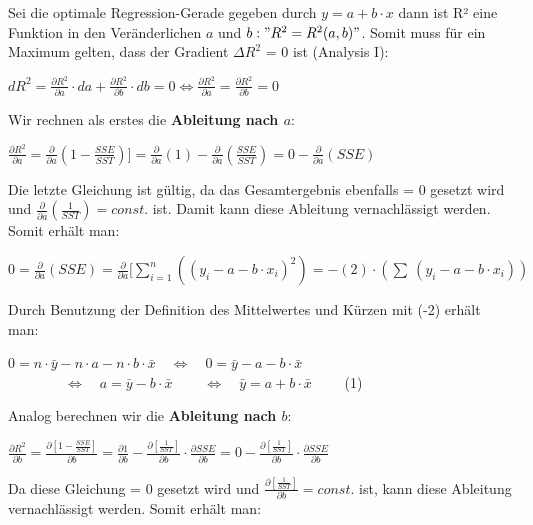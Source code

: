 \documentclass[12pt]{article}
\begin{document}
Sei die optimale Regression-Gerade gegeben durch $ y = a + b \cdot x $ dann ist R² eine Funktion in den Veränderlichen $a$ und $ b: " R^2 = R^2(a,b)" $. Somit muss für ein Maximum gelten, dass der Gradient $\Delta{R^2}$ = 0 ist (Analysis I): 
\begin{center}
\begin{large} 
$  dR^2 = \frac{\partial R^2}{\partial a} \cdot da + \frac{\partial R^2}{\partial b} \cdot db = 0 \Longleftrightarrow  \frac{\partial R^2}{\partial a} = \frac{\partial R^2}{\partial b} = 0 $
\end{large}
\end{center}
%
Wir rechnen als erstes die \textbf{Ableitung nach $a$}:
% 
\begin{center}
\begin{large} 
$ \frac{\partial R^2}{\partial a} = \frac{\partial}{\partial a}(1 - \frac {SSE}{SST})]  =  \frac{\partial}{\partial a}(1) - \frac{\partial}{\partial a}(\frac{SSE}{SST})= 0 -  \frac{\partial}{\partial a}(SSE) $ 
\end{large}
\end{center}
% 
Die letzte Gleichung ist gültig, da das Gesamtergebnis ebenfalls = 0 gesetzt wird und $ \frac{\partial}{\partial a}(\frac{1}{SST}) = const. $ ist. Damit kann diese Ableitung vernachlässigt werden. Somit erhält man: \\ 

\begin{center}
\begin{large} 
$ 0 = \frac{\partial}{\partial a}(SSE) = \frac{\partial}{\partial a}[\sum\limits_{i=1}^n {((y_i - a -b \cdot x_i)^2)} = -(2) \cdot (\sum\ (y_i - a - b \cdot  x_i)) $
\end{large}
\end{center}
%
Durch Benutzung der Definition des Mittelwertes und Kürzen mit (-2) erhält man: 

\begin{center}
$ 0 = n \cdot \bar{y} - n \cdot a -n \cdot b \cdot \bar{x} \quad \Leftrightarrow \quad 0 = \bar{y} - a  -b \cdot \bar{x}$ \\[0.2cm] 
$ \qquad \qquad \Leftrightarrow \quad a = \bar{y} -b \cdot \bar{x} \qquad\ \Leftrightarrow \quad \bar{y} = a +  b \cdot \bar{x} \qquad $ (1)
\end{center}

Analog berechnen wir die \textbf{Ableitung nach $b$}:
 
\begin{center}
\begin{large} 
$ \frac{\partial R^2}{\partial b} = \frac{\partial [ 1 - \frac {SSE}{SST}]}{\partial b} =  \frac{\partial 1}{\partial b} - \frac{\partial [\frac{1}{SST}]}{\partial b} \cdot \frac{\partial SSE}{\partial b} = 0 -  \frac{\partial [\frac{1}{SST}]}{\partial b} \cdot \frac{\partial SSE}{\partial b} $ 
\end{large}
\end{center}
% 
Da diese Gleichung = 0 gesetzt wird und $ \frac{\partial [\frac{1}{SST}]}{\partial b} = const. $ ist, kann diese Ableitung vernachlässigt werden. Somit erhält man: 
\end{document}
